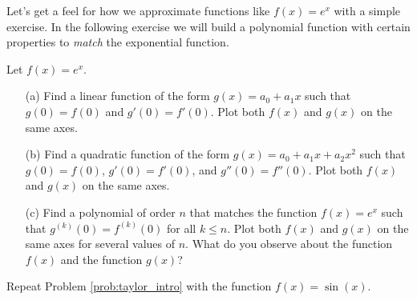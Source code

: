 Let's get a feel for how we approximate functions like $f(x) = e^x$ with a simple
exercise. In the following exercise we will build a polynomial function with certain
properties to {\it match} the exponential function.
\begin{problem}\label{prob:taylor_intro}
    Let $f(x) = e^x$.
    \begin{enumerate}
        \item[(a)] Find a linear function of the form $g(x) = a_0 + a_1 x$ such that $g(0)
            = f(0)$ and $g'(0) = f'(0)$.  Plot both $f(x)$ and $g(x)$ on the same axes. 
        \item[(b)] Find a quadratic function of the form $g(x) = a_0 + a_1 x + a_2 x^2$
            such that $g(0) = f(0)$, $g'(0) = f'(0)$, and $g''(0) = f''(0)$.  Plot both $f(x)$ and $g(x)$ on the same axes. 
        \item[(c)] Find a polynomial of order $n$ that matches the function $f(x) = e^x$
            such that $g^{(k)}(0) = f^{(k)}(0)$ for all $k \le n$.  Plot both $f(x)$ and
            $g(x)$ on the same axes for several values of $n$.  What do you observe about
            the function $f(x)$ and the function $g(x)$? \solution{
                \[ g(x) = 1 + x + \frac{x^2}{2} + \frac{x^3}{3!} + \frac{x^4}{4!} + \cdots
                    + \frac{x^n}{n!}. \]
            }
    \end{enumerate}
\end{problem}

\begin{problem}\label{prob:taylor_intro2}
    Repeat Problem \ref{prob:taylor_intro} with the function $f(x) = \sin(x)$.
\end{problem}
\solution{
    \[ g(x) = x - \frac{x^3}{3!} + \frac{x^5}{5!} - \frac{x^7}{7!} + \cdots . \]
}

